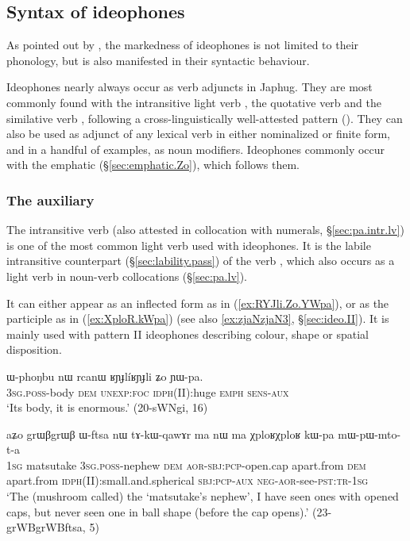 \subsection{Syntax of ideophones} \label{sec:idph.syntax}
As pointed out by \citet[660]{dingemanse12ideo}, the markedness of ideophones is not limited to their phonology, but is also manifested in their syntactic behaviour.

Ideophones nearly always occur as verb adjuncts in Japhug. They are most commonly found with the intransitive light verb , the quotative verb  and the similative verb , following a cross-linguistically well-attested pattern (\citealt[280--288]{guldemann08quot}). They can also be used as adjunct of any lexical verb in either nominalized or finite form, and in a handful of examples, as noun modifiers. Ideophones commonly occur with the emphatic  (§\ref{sec:emphatic.Zo}), which follows them.

\subsubsection{The auxiliary } \label{sec:idph.pa}
The intransitive verb  (also attested in collocation with numerals, §\ref{sec:pa.intr.lv}) is one of the most common light verb used with ideophones. It is the labile intransitive counterpart (§\ref{sec:lability.pass}) of the verb , which also occurs as a light verb in noun-verb collocations (§\ref{sec:pa.lv}). 

It can either appear as an inflected form as in (\ref{ex:RYJli.Zo.YWpa}), or as the participle  as in (\ref{ex:XploR.kWpa}) (see also \ref{ex:zjaNzjaN3}, §\ref{sec:ideo.II}). It is mainly used with pattern II ideophones describing colour, shape or spatial disposition.

 
\begin{exe}
\ex \label{ex:RYJli.Zo.YWpa}
\gll ɯ-phoŋbu nɯ rcanɯ ʁɲɟlíʁɲɟli ʑo ɲɯ-pa. \\
\textsc{3sg}.\textsc{poss}-body \textsc{dem} \textsc{unexp}:\textsc{foc} \textsc{idph}(II):huge \textsc{emph} \textsc{sens}-\textsc{aux} \\
\glt  `Its body, it is enormous.' (20-sWNgi, 16)
\end{exe}

\begin{exe}
\ex \label{ex:XploR.kWpa}
\gll aʑo grɯβgrɯβ ɯ-ftsa nɯ tɤ-kɯ-qawɤr ma nɯ ma χploʁχploʁ kɯ-pa mɯ-pɯ-mto-t-a \\
\textsc{1sg} matsutake \textsc{3sg}.\textsc{poss}-nephew \textsc{dem} \textsc{aor}-\textsc{sbj}:\textsc{pcp}-open.cap apart.from \textsc{dem} apart.from \textsc{idph}(II):small.and.spherical \textsc{sbj}:\textsc{pcp}-\textsc{aux} \textsc{neg}-\textsc{aor}-see-\textsc{pst}:\textsc{tr}-\textsc{1sg} \\
\glt `The (mushroom called) the `matsutake's nephew', I have seen ones with opened caps, but never seen one in ball shape (before the cap opens).' (23-grWBgrWBftsa, 5)
\end{exe}

